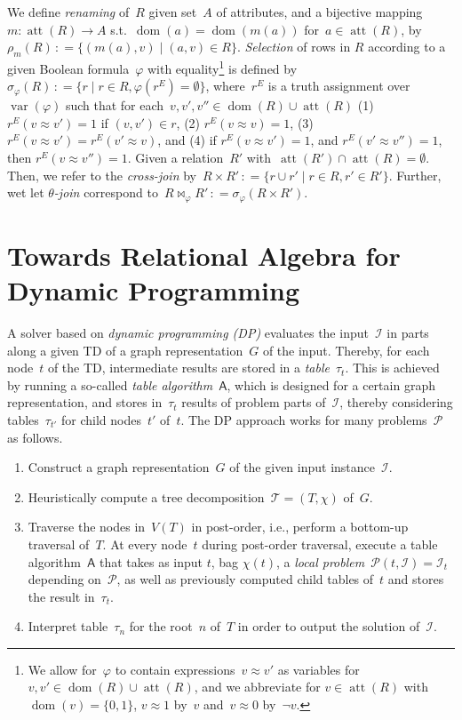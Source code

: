 \documentclass{llncs}
\newcommand{\eqdef}{\ensuremath{\,\mathrel{\mathop:}=}}
\newcommand{\TTT}{\mathcal{T}}
\DeclareMathOperator{\dom}{dom}
\DeclareMathOperator{\attr}{att}
\newcommand{\algo}[1]{\ensuremath{\mathsf{#1}}}
\newcommand{\tab}[1]{\ensuremath{\tau_{#1}}}
\DeclareMathOperator{\var}{var}
\begin{document}
We define \emph{renaming} of~$R$ given set~$A$ of attributes, and a bijective mapping~$m:\attr(R) \rightarrow A$ s.t.\ $\dom(a)=\dom(m(a))$ for~$a\in\attr(R)$, by~$\rho_m(R) \eqdef \{(m(a),v) \mid (a,v)\in R\}$.
\emph{Selection} of rows in $R$ according to a given Boolean formula~$\varphi$ with equality\footnote{We allow for~$\varphi$ to contain expressions~$v{\approx}v'$ as variables for $v,v'\in\dom(R)\cup\attr(R)$, and we abbreviate for $v\in\attr(R)$ with~$\dom(v)=\{0,1\}$, $v{\approx}1$ by~$v$ and~$v{\approx}0$ by~$\neg v$.} is defined by~$\sigma_{\varphi}(R)\eqdef \{ r \mid r\in R, \varphi(r^E)=\emptyset \}$, where~$r^{E}$ is a truth assignment over~$\var(\varphi)$ such that for each~$v,v',v''\in\dom(R)\cup\attr(R)$ (1) $r^E(v{\approx}v')=1$ if $(v, v')\in r$, (2) $r^E(v{\approx}v)=1$, (3) $r^E(v{\approx}v')=r^E(v'{\approx}v)$, and (4) if $r^E(v{\approx}v')=1$, and $r^E(v'{\approx}v'')=1$, then $r^E(v{\approx}v'')=1$.
Given a relation~$R'$ with~$\attr(R')\cap\attr(R)=\emptyset$. Then, we refer to the \emph{cross-join} by~$R\times R'\eqdef \{ r\cup r' \mid r\in R, r'\in R'\}$.
Further, wet let \emph{$\theta$-join} correspond to~$R \bowtie_\varphi R' \eqdef \sigma_\varphi(R\times R')$.


\section{Towards Relational Algebra for Dynamic Programming}
A solver based on \emph{dynamic programming (DP)} %
evaluates the input~$\mathcal{I}$ in parts along a given TD of a graph representation~$G$
of the input.
Thereby, for each node~$t$ of the TD, intermediate results are %
stored in a \emph{table}~$\tab{t}$. %
This is achieved by running a so-called \emph{table algorithm}~$\algo{A}$,
which is designed for a certain graph representation, 
and stores in~$\tab{t}$ results of problem parts of~$\mathcal{I}$,
thereby considering tables~$\tab{t'}$ for child nodes~$t'$ of~$t$. %
%
The DP approach works for many problems~$\mathcal{P}$ as follows. %
\begin{enumerate}%
\item Construct a graph representation~$G$ of the given input instance~$\mathcal{I}$.
\item Heuristically compute a tree decomposition~$\TTT=(T,\chi)$ of~$G$.
\item\label{step:dp} Traverse the nodes in~$V(T)$ in
  post-order, i.e., perform a bottom-up traversal of~$T$.
  At every node~$t$ during post-order traversal, execute a table algorithm~$\algo{A}$ 
  that takes as input $t$, bag $\chi(t)$, a \emph{local problem}~$\mathcal{P}(t,\mathcal{I})=\mathcal{I}_t$ depending on~$\mathcal{P}$, as well as previously computed child tables of~$t$ and stores the result in~$\tab{t}$.
\item Interpret table~$\tab{n}$ for the root~$n$ of~$T$ in order to output the solution of~$\mathcal{I}$.
\end{enumerate}
\end{document}
